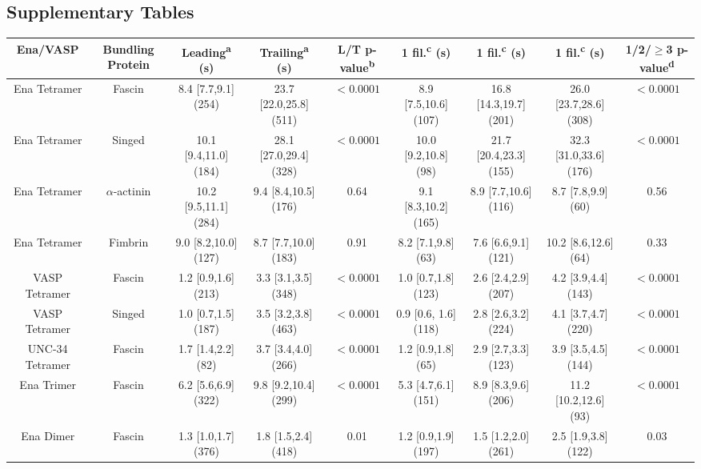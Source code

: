 \clearpage
\subsection{Supplementary Tables}\label{ch02-supplementary-tables}

\begin{table}[hbtp]
\footnotesize
\centering 
\begin{tabulary}{1.0\textwidth}{C C C C C C C C C}
\toprule Ena\slash VASP & Bundling Protein & Leading\textsuperscript{a} (s) & Trailing\textsuperscript{a} (s) & L/T p-value\textsuperscript{b} & 1 fil.\textsuperscript{c} (s) &  1 fil.\textsuperscript{c} (s) & 1 fil.\textsuperscript{c} (s) & 1/2/$\geq$3 p-value\textsuperscript{d} \\ \midrule 
Ena Tetramer & Fascin & 8.4 [7.7,9.1] (254) & 23.7 [22.0,25.8] (511) & ${<0.0001}$ & 8.9 [7.5,10.6] (107) & 16.8 [14.3,19.7] (201) & 26.0 [23.7,28.6] (308) & ${<0.0001}$ \\ 
Ena Tetramer & Singed & 10.1 [9.4,11.0] (184) & 28.1 [27.0,29.4] (328) & ${<0.0001}$ & 10.0 [9.2,10.8] (98) & 21.7 [20.4,23.3] (155) & 32.3 [31.0,33.6] (176) & ${<0.0001}$ \\ 
Ena Tetramer & $\alpha$-actinin & 10.2 [9.5,11.1] (284) & 9.4 [8.4,10.5] (176) & 0.64 & 9.1 [8.3,10.2] (165) & 8.9 [7.7,10.6] (116) & 8.7 [7.8,9.9] (60) & 0.56 \\
Ena Tetramer & Fimbrin & 9.0 [8.2,10.0] (127) & 8.7 [7.7,10.0] (183) & 0.91 & 8.2 [7.1,9.8] (63) & 7.6 [6.6,9.1] (121) & 10.2 [8.6,12.6] (64) & 0.33 \\
VASP Tetramer & Fascin & 1.2 [0.9,1.6] (213) & 3.3 [3.1,3.5] (348) & ${<0.0001}$ & 1.0 [0.7,1.8] (123) & 2.6 [2.4,2.9] (207) & 4.2 [3.9,4.4] (143) & ${<0.0001}$ \\
VASP Tetramer & Singed & 1.0 [0.7,1.5] (187) & 3.5 [3.2,3.8] (463) & ${<0.0001}$ & 0.9  [0.6, 1.6] (118) & 2.8 [2.6,3.2] (224) & 4.1 [3.7,4.7] (220) & ${<0.0001}$ \\
UNC-34 Tetramer & Fascin & 1.7 [1.4,2.2] (82) & 3.7 [3.4,4.0] (266) & ${<0.0001}$ & 1.2 [0.9,1.8] (65) & 2.9 [2.7,3.3] (123) & 3.9 [3.5,4.5] (144) & ${<0.0001}$ \\
Ena Trimer & Fascin & 6.2 [5.6,6.9] (322) & 9.8 [9.2,10.4] (299) & ${<0.0001}$ & 5.3 [4.7,6.1] (151) & 8.9 [8.3,9.6] (206) & 11.2 [10.2,12.6] (93) & ${<0.0001}$ \\
Ena Dimer & Fascin & 1.3 [1.0,1.7] (376) & 1.8 [1.5,2.4] (418) & 0.01 & 1.2 [0.9,1.9] (197) & 1.5 [1.2,2.0] (261) & 2.5 [1.9,3.8] (122) & 0.03 \\

\end{tabulary}
\end{table}

